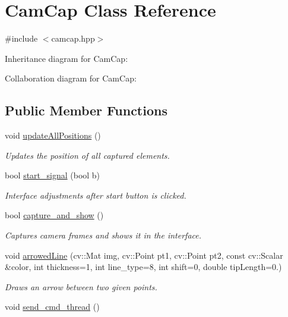 \hypertarget{class_cam_cap}{}\section{Cam\+Cap Class Reference}
\label{class_cam_cap}


{\ttfamily \#include $<$camcap.\+hpp$>$}



Inheritance diagram for Cam\+Cap\+:


Collaboration diagram for Cam\+Cap\+:
\subsection*{Public Member Functions}
\begin{DoxyCompactItemize}
\item 
void \hyperlink{class_cam_cap_afc272fe8b0ddc82386dbf827aed7db78}{update\+All\+Positions} ()
\begin{DoxyCompactList}\small\item\em Updates the position of all captured elements. \end{DoxyCompactList}\item 
bool \hyperlink{class_cam_cap_ae676e6624dd821ad494a80e68a41e249}{start\+\_\+signal} (bool b)
\begin{DoxyCompactList}\small\item\em Interface adjustments after \textquotesingle{}start\textquotesingle{} button is clicked. \end{DoxyCompactList}\item 
bool \hyperlink{class_cam_cap_a87f384c5fec40a0ccfd7833347fec0df}{capture\+\_\+and\+\_\+show} ()
\begin{DoxyCompactList}\small\item\em Captures camera frames and shows it in the interface. \end{DoxyCompactList}\item 
void \hyperlink{class_cam_cap_afb044a7b5b3b2f17af62e3115e84993e}{arrowed\+Line} (cv\+::\+Mat img, cv\+::\+Point pt1, cv\+::\+Point pt2, const cv\+::\+Scalar \&color, int thickness=1, int line\+\_\+type=8, int shift=0, double tip\+Length=0.)
\begin{DoxyCompactList}\small\item\em Draws an arrow between two given points. \end{DoxyCompactList}\item 
void \hyperlink{class_cam_cap_a0f09ee70dc70ffad088a87bd3011592d}{send\+\_\+cmd\+\_\+thread} ()

\end{DoxyCompactItemize}
